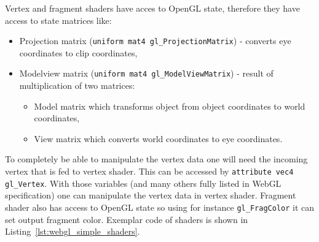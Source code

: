 \clearpage

Vertex and fragment shaders have acces to OpenGL state, therefore they have access to state matrices like:
\begin{itemize}
\item Projection matrix (\texttt{uniform mat4 gl\_ProjectionMatrix}) - converts eye coordinates to clip coordinates,
\item Modelview matrix (\texttt{uniform mat4 gl\_ModelViewMatrix}) - result of multiplication of two matrices: 
\begin{itemize}
\item Model matrix which transforms object from object coordinates to world coordinates,
\item View matrix which converts world coordinates to eye coordinates. 
\end{itemize}
\end{itemize}

To completely be able to manipulate the vertex data one will need the incoming vertex that is fed to vertex shader.
This can be accessed by \texttt{attribute vec4 gl\_Vertex}.
With those variables (and many others fully listed in WebGL specification) one can manipulate the vertex data in vertex shader.
Fragment shader also has access to OpenGL state so using for instance \texttt{gl\_FragColor} it can set output fragment color.
Exemplar code of shaders is shown in Listing~\ref{lst:webgl_simple_shaders}. 

\begin{filecode}[label=lst:webgl_simple_shaders,language=HTML,caption=Exemplar implementation of vertex and fragment shaders written in GLSL ES.]

\end{filecode}
